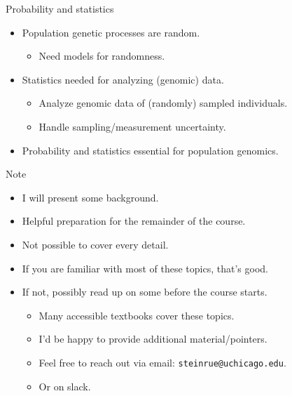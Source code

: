 \documentclass{beamer}
\newcommand{\1}{\ensuremath{\mathbf{1}}}
\begin{document}
\begin{frame}{Probability and statistics}
    \begin{itemize}
        \item Population genetic processes are random.
        \begin{itemize}
            \item Need models for randomness.
        \end{itemize}
        \item Statistics needed for analyzing (genomic) data.
        \begin{itemize}
            \item Analyze genomic data of (randomly) sampled individuals.
            \item Handle sampling/measurement uncertainty.
        \end{itemize}
    \end{itemize}
    \begin{block}{}
        \begin{itemize}
            \item[$\to$] Probability and statistics essential for population genomics. 
        \end{itemize}
    \end{block}
\end{frame}
%
%
%
\begin{frame}{Note}
    \begin{itemize}
        \item I will present some background.
        \item Helpful preparation for the remainder of the course.
        \item Not possible to cover every detail.
        \item If you are familiar with most of these topics, that's good.
        \item If not, possibly read up on some before the course starts.
        \begin{itemize}
            \item Many accessible textbooks cover these topics.
            \item I'd be happy to provide additional material/pointers.
            \item Feel free to reach out via email: \texttt{steinrue@uchicago.edu}.
            \item Or on slack.
        \end{itemize}
    \end{itemize}
\end{frame}
\end{document}

